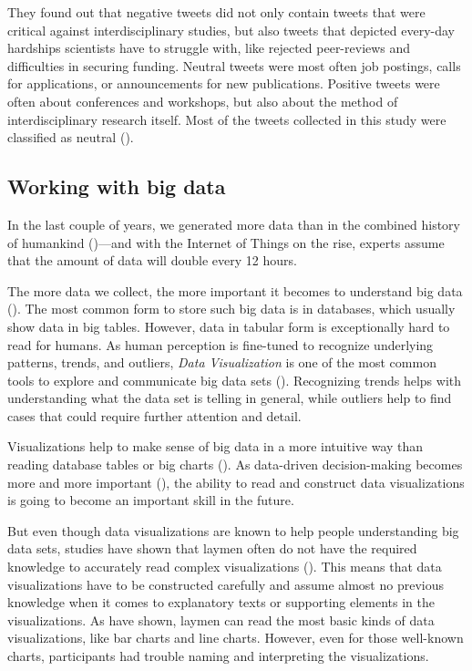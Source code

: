 They found out that negative tweets did not only contain tweets that were critical against interdisciplinary studies, but also tweets that depicted every-day hardships scientists have to struggle with, like rejected peer-reviews and difficulties in securing funding. Neutral tweets were most often job postings, calls for applications, or announcements for new publications. Positive tweets were often about conferences and workshops, but also about the method of interdisciplinary research itself. Most of the tweets collected in this study were classified as neutral (\cite[7]{weberInterdisciplinaryOptimismSentiment2019}).


\subsection{Working with big data}
In the last couple of years, we generated more data than in the combined history of humankind (\cite{helbing2019will})---and with the Internet of Things on the rise, experts assume that the amount of data will double every 12 hours.

The more data we collect, the more important it becomes to understand big data (\cite{bornerDataVisualizationLiteracy2019}). The most common form to store such big data is in databases, which usually show data in big tables. However, data in tabular form is exceptionally hard to read for humans. As human perception is fine-tuned to recognize underlying patterns, trends, and outliers, \emph{Data Visualization} is one of the most common tools to explore and communicate big data sets (\cite{heerTourVisualizationZoo2010}). Recognizing trends helps with understanding what the data set is telling in general, while outliers help to find cases that could require further attention and detail.

Visualizations help to make sense of big data in a more intuitive way than reading database tables or big charts (\cite{donalekImmersiveCollaborativeData2014}). As data-driven decision-making becomes more and more important (\cite{brynjolfssonStrengthNumbersHow2011}), the ability to read and construct data visualizations is going to become an important skill in the future.

But even though data visualizations are known to help people understanding big data sets, studies have shown that laymen often do not have the required knowledge to accurately read complex visualizations (\cite{bornerInvestigatingAspectsData2016}). This means that data visualizations have to be constructed carefully and assume almost no previous knowledge when it comes to explanatory texts or supporting elements in the visualizations. As \citeauthor{bornerInvestigatingAspectsData2016} have shown, laymen can read the most basic kinds of data visualizations, like bar charts and line charts. However, even for those well-known charts, participants had trouble naming and interpreting the visualizations.

